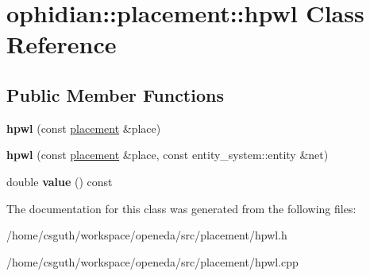 \hypertarget{classophidian_1_1placement_1_1hpwl}{\section{ophidian\-:\-:placement\-:\-:hpwl Class Reference}
\label{classophidian_1_1placement_1_1hpwl}
}
\subsection*{Public Member Functions}
\begin{DoxyCompactItemize}
\item 
\hypertarget{classophidian_1_1placement_1_1hpwl_a20e3de33a5620e5d70d5e5728f83b97d}{{\bfseries hpwl} (const \hyperlink{classophidian_1_1placement_1_1placement}{placement} \&place)}\label{classophidian_1_1placement_1_1hpwl_a20e3de33a5620e5d70d5e5728f83b97d}

\item 
\hypertarget{classophidian_1_1placement_1_1hpwl_a7b10eea3db23af7d3eccb6e41a95395d}{{\bfseries hpwl} (const \hyperlink{classophidian_1_1placement_1_1placement}{placement} \&place, const entity\-\_\-system\-::entity \&net)}\label{classophidian_1_1placement_1_1hpwl_a7b10eea3db23af7d3eccb6e41a95395d}

\item 
\hypertarget{classophidian_1_1placement_1_1hpwl_a1032f6402a5d2d279aa940dca01f4618}{double {\bfseries value} () const }\label{classophidian_1_1placement_1_1hpwl_a1032f6402a5d2d279aa940dca01f4618}

\end{DoxyCompactItemize}


The documentation for this class was generated from the following files\-:\begin{DoxyCompactItemize}
\item 
/home/csguth/workspace/openeda/src/placement/hpwl.\-h\item 
/home/csguth/workspace/openeda/src/placement/hpwl.\-cpp\end{DoxyCompactItemize}
